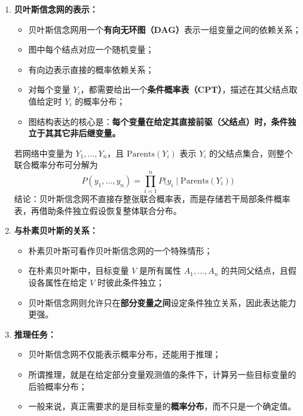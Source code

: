 \documentclass[../main.tex]{subfiles}
\begin{document}
\begin{enumerate}
    \item \textbf{贝叶斯信念网的表示：}
    \begin{itemize}
        \item 贝叶斯信念网用一个\textbf{有向无环图（DAG）}表示一组变量之间的依赖关系；
        \item 图中每个结点对应一个随机变量；
        \item 有向边表示直接的概率依赖关系；
        \item 对每个变量 $Y_i$，都需要给出一个\textbf{条件概率表（CPT）}，描述在其父结点取值给定时 $Y_i$ 的概率分布；
        \item 图结构表达的核心是：\textbf{每个变量在给定其直接前驱（父结点）时，条件独立于其其它非后继变量。}
    \end{itemize}

    若网络中变量为 $Y_1,\ldots,Y_n$，且 $\mathrm{Parents}(Y_i)$ 表示 $Y_i$ 的父结点集合，则整个联合概率分布可分解为
    $$
    P(y_1,\ldots,y_n)=\prod_{i=1}^{n}P\bigl(y_i\mid \mathrm{Parents}(Y_i)\bigr)
    $$
    结论：贝叶斯信念网不直接存整张联合概率表，而是存储若干局部条件概率表，再借助条件独立假设恢复整体联合分布。

    \item \textbf{与朴素贝叶斯的关系：}
    \begin{itemize}
        \item 朴素贝叶斯可看作贝叶斯信念网的一个特殊情形；
        \item 在朴素贝叶斯中，目标变量 $V$ 是所有属性 $A_1,\ldots,A_n$ 的共同父结点，且假设各属性在给定 $V$ 时彼此条件独立；
        \item 贝叶斯信念网则允许只在\textbf{部分变量之间}设定条件独立关系，因此表达能力更强。
    \end{itemize}

    \item \textbf{推理任务：}
    \begin{itemize}
        \item 贝叶斯信念网不仅能表示概率分布，还能用于推理；
        \item 所谓推理，就是在给定部分变量观测值的条件下，计算另一些目标变量的后验概率分布；
        \item 一般来说，真正需要求的是目标变量的\textbf{概率分布}，而不只是一个确定值。
    \end{itemize}


\end{enumerate}
\end{document}
